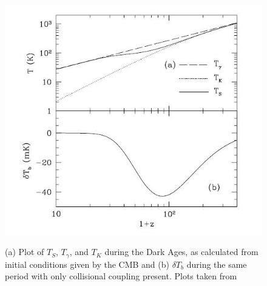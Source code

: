 \documentclass[12pt,a4paper]{report}
\begin{document}
	\begin{figure}[htb!]
		\begin{center}
			\includegraphics[width=0.7\linewidth]{Figures/DA.png}\\
			\caption{(a) Plot of $T_S$, $T_\gamma$, and $T_K$ during the Dark Ages, as calculated from initial conditions given by the CMB and (b) $\delta$$T_b$ during the same period with only collisional coupling present. Plots taken from~\citep{2006PhR...433..181F}} 
			\label{Fig:DA}
		\end{center}
	\end{figure}
%	
%
%
\end{document}
